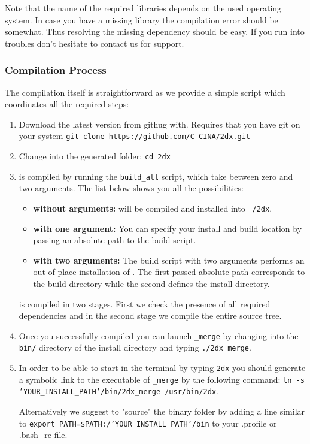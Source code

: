 Note that the name of the required libraries depends on the used operating system. In case you have a missing library the compilation error should be somewhat. Thus resolving the missing dependency should be easy. If you run into troubles don't hesitate to contact us for support.


\subsubsection{Compilation Process}
The compilation itself is straightforward as we provide a simple script which coordinates all the required steps:

\begin{enumerate}
	\item Download the latest version from githug with. Requires that you have git on your system
	\newline
	\texttt{git clone https://github.com/C-CINA/2dx.git}
	
	\item Change into the generated folder:
		\newline 
	\texttt{cd 2dx}

	\item {\twodx} is compiled by running the \texttt{build\_all} script, which take between zero and two arguments. The list below shows you all the possibilities:
	\begin{itemize}
		\item \textbf{without arguments:} {\twodx} will be compiled and installed into \texttt{~/2dx}.
		\item \textbf{with one argument:} You can specify your install and build location by passing an absolute path to the build script.
		\item \textbf{with two arguments:} The build script with two arguments performs an out-of-place installation of {\twodx}. The first passed absolute path corresponds to the build directory while the second defines the install directory.  
	\end{itemize}
	
	{\twodx} is compiled in two stages. First we check the presence of all required dependencies and in the second stage we compile the entire source tree.
	
	\item Once you successfully compiled {\twodx} you can launch {\twodx}\texttt{\_merge} by changing into the \texttt{bin/} directory of the install directory and typing \texttt{./2dx\_merge}.
	
	\item In order to be able to start {\twodx} in the terminal by typing \texttt{2dx} you should generate a symbolic link to the executable of {\twodx}\texttt{\_merge} by the following command:\newline
	\texttt{ln -s 'YOUR\_INSTALL\_PATH'/bin/2dx\_merge /usr/bin/2dx}.
	
	Alternatively we suggest to "source" the binary folder by adding a line similar to \texttt{export PATH=\$PATH:/'YOUR\_INSTALL\_PATH'/bin} to your .profile or .bash\_rc file.
	
\end{enumerate}




